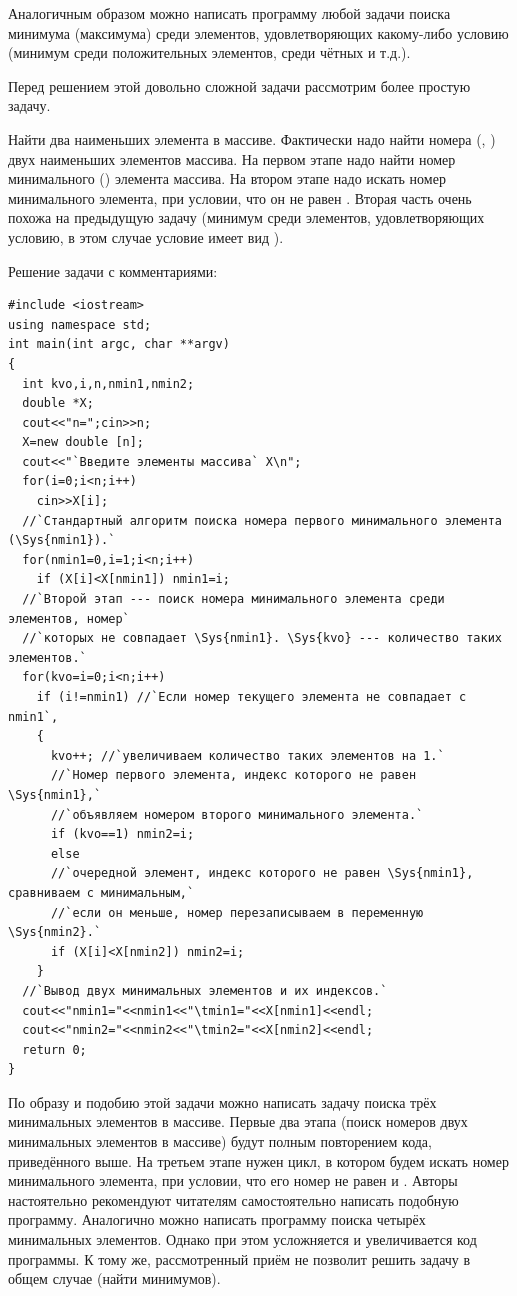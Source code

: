 Аналогичным образом можно написать программу любой задачи поиска минимума (максимума) среди элементов, удовлетворяющих
какому-либо условию (минимум среди положительных элементов, среди чётных и т.д.). 


Перед решением этой довольно сложной задачи рассмотрим более простую задачу.

Найти два наименьших элемента в массиве. Фактически надо найти номера
(, ) двух наименьших элементов
массива. На первом этапе надо найти номер минимального () элемента массива. На втором этапе
надо искать номер минимального элемента, при условии, что он не равен . Вторая часть очень
похожа на предыдущую задачу (минимум среди элементов, удовлетворяющих условию, в этом случае условие имеет вид
).

Решение задачи с комментариями:

\begin{lstlisting}
#include <iostream>
using namespace std;
int main(int argc, char **argv)
{
  int kvo,i,n,nmin1,nmin2;
  double *X;
  cout<<"n=";cin>>n;
  X=new double [n];
  cout<<"`Введите элементы массива` X\n";
  for(i=0;i<n;i++)
    cin>>X[i];
  //`Стандартный алгоритм поиска номера первого минимального элемента (\Sys{nmin1}).`
  for(nmin1=0,i=1;i<n;i++)
    if (X[i]<X[nmin1]) nmin1=i;
  //`Второй этап --- поиск номера минимального элемента среди элементов, номер` 
  //`которых не совпадает \Sys{nmin1}. \Sys{kvo} --- количество таких элементов.`
  for(kvo=i=0;i<n;i++)
    if (i!=nmin1) //`Если номер текущего элемента не совпадает с nmin1`, 
    {
      kvo++; //`увеличиваем количество таких элементов на 1.`
      //`Номер первого элемента, индекс которого не равен \Sys{nmin1},` 
      //`объявляем номером второго минимального элемента.`
      if (kvo==1) nmin2=i; 
      else
      //`очередной элемент, индекс которого не равен \Sys{nmin1}, сравниваем с минимальным,` 
      //`если он меньше, номер перезаписываем в переменную \Sys{nmin2}.`
      if (X[i]<X[nmin2]) nmin2=i;
    }
  //`Вывод двух минимальных элементов и их индексов.`
  cout<<"nmin1="<<nmin1<<"\tmin1="<<X[nmin1]<<endl;
  cout<<"nmin2="<<nmin2<<"\tmin2="<<X[nmin2]<<endl;
  return 0;
}
\end{lstlisting}


По образу и подобию этой задачи можно написать задачу поиска трёх минимальных элементов в массиве. Первые два этапа
(поиск номеров двух минимальных элементов в массиве) будут полным повторением кода, приведённого выше. На третьем этапе
нужен цикл, в котором будем искать номер минимального элемента, при условии, что его номер не равен
 и . Авторы настоятельно рекомендуют читателям самостоятельно написать
подобную программу. Аналогично можно написать программу поиска четырёх минимальных элементов. Однако при этом
усложняется и увеличивается код программы. К тому же, рассмотренный приём не позволит решить задачу в общем случае
(найти  минимумов). 

